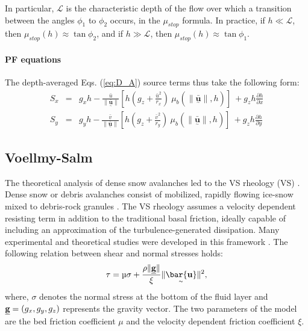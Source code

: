 \documentclass[nhess, manuscript]{copernicus}
\begin{document}
In particular, $\mathcal{L}$ is the characteristic depth of the flow over which a transition between the angles $\phi_{1}$ to $\phi_{2}$ occurs, in the $\mu_{stop}$ formula. In practice, if $h\ll \mathcal L$, then $\mu_{stop}(h)\approx \tan\phi_{2}$, and if $h\gg \mathcal L$, then $\mu_{stop}(h)\approx\tan\phi_{1}$.

\paragraph{PF equations} The depth-averaged Eqs. (\ref{eq:D_A}) source terms thus take the following form:
\begin{eqnarray}\label{eq:S_terms_PF}
S_{x} &=&  g_{x} h -  \frac{\bar{u}}{\| \underset{^\sim}{\bar{\textbf{u}}} \|}\left[h \left(g_z+\frac{\bar{u}^2}{r_x}\right) \ \mu_{b}(\|\underset{^\sim}{\bar{\textbf{u}}} \| , h)\right] \ + g_{z}h\frac{\partial h}{\partial x} \nonumber \\
S_{y} &=&  g_{y} h - \frac{\bar{v}}{\| \underset{^\sim}{\bar{\textbf{u}}} \|}\left[h \left(g_z +\frac{\bar{v}^2}{r_y}\right) \ \mu_{b}(\|\underset{^\sim}{\bar{\textbf{u}}} \| , h)\right] \ + g_{z}h\frac{\partial h}{\partial y}
\end{eqnarray}

\subsection{Voellmy-Salm}\label{VSM}
The theoretical analysis of dense snow avalanches led to the VS rheology (VS) \citep{Voellmy1955, Salm1990, Salm1993, Bartelt1999}. Dense snow or debris avalanches consist of mobilized, rapidly flowing ice-snow mixed to debris-rock granules \citep{BarteltMcArdell2009}. The VS rheology assumes a velocity dependent resisting term in addition to the traditional basal friction, ideally capable of including an approximation of the turbulence-generated dissipation. Many experimental and theoretical studies were developed in this framework \citep{Gruber2007, Kern2009, Christen2010, Fischer2012}. The following relation between shear and normal stresses holds:
\begin{equation}
\tau = \mu \sigma + \frac{\rho \| \underline{\textbf g} \|}{\xi} \| \underset{^\sim}{\bar{\textbf u}} \|^2,
\end{equation}
where, $\sigma$ denotes the normal stress at the bottom of the fluid layer and $\underline{\textbf g} = (g_{x} , g_{y} , g_{z})$ represents the gravity vector. The two parameters of the model are the bed friction coefficient $\mu$ and the velocity dependent friction coefficient $\xi$.
\end{document}
